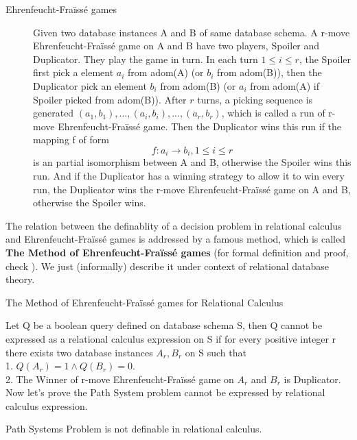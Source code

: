 \begin{description}
\item[Ehrenfeucht-Fra\"iss\'e games]
Given two database instances A and B of same database schema. A r-move Ehrenfeucht-Fra\"iss\'e game on A and B have two players, Spoiler and Duplicator. They play the game in turn. In each turn $1\leq i \leq r$, the Spoiler first pick a element $a_i$ from adom(A) (or $b_i$ from adom(B)), then the Duplicator pick an element $b_i$ from adom(B) (or $a_i$ from adom(A) if Spoiler picked from adom(B)). After $r$ turns, a picking sequence is generated $(a_1, b_1),...,(a_i,b_i),...,(a_r, b_r)$, which is called a run of r-move Ehrenfeucht-Fra\"iss\'e game. Then the Duplicator wins this run if the mapping f of form
$$ f: a_i\rightarrow b_i, 1\leq i \leq r$$
is an partial isomorphism between A and B, otherwise the Spoiler wins this run. And if the Duplicator has a winning strategy to allow it to win every run, the Duplicator wins the r-move Ehrenfeucht-Fra\"iss\'e game on A and B, otherwise the Spoiler wins.
\end{description}

The relation between the definablity of a decision problem in relational calculus and Ehrenfeucht-Fra\"iss\'e games is addressed by a famous method, which is called \textbf{The Method of Ehrenfeucht-Fra\"iss\'e games} (for formal definition and proof, check \cite{kolaitis1}). We just (informally) describe it under context of relational database theory.\\

\begin{description}
\item[The Method of Ehrenfeucht-Fra\"iss\'e games for Relational Calculus]
\end{description}
Let Q be a boolean query defined on database schema S, then Q cannot be expressed as a relational calculus expression on S if for every positive integer r there exists two database instances $A_r, B_r$ on S such that\\
1. $Q(A_r)=1\land Q(B_r)=0$.\\
2. The Winner of r-move Ehrenfeucht-Fra\"iss\'e game on $A_r$ and $B_r$ is Duplicator.\\

Now let's prove the Path System problem cannot be expressed by relational calculus expression.

\begin{claim}
Path Systems Problem is not definable in relational calculus.
\end{claim}

